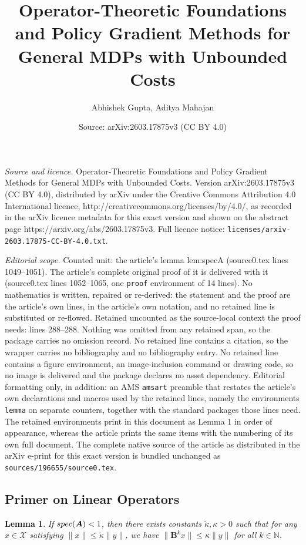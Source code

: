 \documentclass[10pt,a4paper]{amsart}
\title{Operator-Theoretic Foundations and Policy Gradient Methods for General MDPs with Unbounded Costs}
\author{Abhishek Gupta, Aditya Mahajan}
\date{Source: arXiv:2603.17875v3 (CC BY 4.0)}
\newtheorem{lemma}{Lemma}
\newcommand{\Na}{\mathbb{N}}
\newcommand{\op}{\bm}
\newcommand{\spec}{\textttup{spec}}
\newcommand{\textttup}[1]{\textup{\texttt{#1}}}
\begin{document}
\maketitle

\noindent\emph{Source and licence.} Operator-Theoretic Foundations and Policy Gradient Methods for General MDPs with Unbounded Costs. Version arXiv:2603.17875v3 (CC BY 4.0), distributed by arXiv under the Creative Commons Attribution 4.0 International licence, http://creativecommons.org/licenses/by/4.0/, as recorded in the arXiv licence metadata for this exact version and shown on the abstract page https://arxiv.org/abs/2603.17875v3. Full licence notice: \texttt{licenses/arxiv-2603.17875-CC-BY-4.0.txt}.\par\smallskip

\noindent\textit{Editorial scope.} Counted unit: the article's lemma lem:specA (source0.tex lines 1049--1051). The article's complete original proof of it is delivered with it (source0.tex lines 1052--1065, one \texttt{proof} environment of 14 lines). No mathematics is written, repaired or re-derived: the statement and the proof are the article's own lines, in the article's own notation, and no retained line is substituted or re-flowed.  Retained uncounted as the source-local context the proof needs: lines 288--288.  Nothing was omitted from any retained span, so the package carries no omission record.  No retained line contains a citation, so the wrapper carries no bibliography and no bibliography entry.  No retained line contains a figure environment, an image-inclusion command or drawing code, so no image is delivered and the package declares no asset dependency.  Editorial formatting only, in addition: an AMS \texttt{amsart} preamble that restates the article's own declarations and macros used by the retained lines, namely the environments \texttt{lemma} on separate counters, together with the standard packages those lines need.  The retained environments print in this document as Lemma 1 in order of appearance, whereas the article prints the same items with the numbering of its own full document.  The complete native source of the article as distributed in the arXiv e-print for this exact version is bundled unchanged as \texttt{sources/196655/source0.tex}.
\subsection{Primer on Linear Operators}\label{sub:linearop}

\begin{lemma}\label{lem:specA}
     If $\spec(\op A)<1$, then there exists constants $\tilde\kappa, \kappa>0$ such that for any $x\in\mathcal X$ satisfying $ \|x\|\leq \tilde\kappa\|y\|$, we have $\|\op B^k x\|\leq \kappa \|y\|$ for all $k\in \Na$.
\end{lemma}
\end{document}
